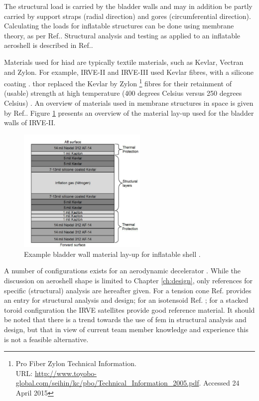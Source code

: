 The structural load is carried by the bladder walls and may in addition be partly carried by support straps (radial direction) and gores (circumferential direction). Calculating the loads for inflatable structures can be done using membrane theory, as per Ref.\cite{Young2002}. Structural analysis and testing as applied to an inflatable aeroshell is described in Ref.\cite{Lindell2006}.

Materials used for \gls{hiad} are typically textile materials, such as Kevlar, Vectran and Zylon. For example, IRVE-II and IRVE-III used Kevlar fibres, with a silicone coating \cite{Dillman2012a}. \gls{thor} replaced the Kevlar by Zylon \footnote{Pro Fiber Zylon Technical Information. \\ URL: \url{http://www.toyobo-global.com/seihin/kc/pbo/Technical\_Information\_2005.pdf}. Accessed 24 April 2015} fibres for their retainment of (usable) strength at high temperature (400 degrees Celsius versus 250 degrees Celsius) \cite{Dillman2014}. An overview of materials used in membrane structures in space is given by Ref.\cite{Jenkins2001}. Figure \ref{fig:matlayup} presents an overview of the material lay-up used for the bladder walls of IRVE-II.

\begin{figure}[H]
\centering
\includegraphics[width = 0.55\textwidth]{Figure/IRVE2_bladder_mat.PNG}
\caption{Example bladder wall material lay-up for inflatable shell \cite[p.2]{Dillman2010}.}
\label{fig:matlayup}
\end{figure}

A number of configurations exists for an aerodynamic decelerator \cite{Smith2010}. While the discussion on aeroshell shape is limited to Chapter \ref{ch:design}, only references for specific (structural) analysis are hereafter given. For a tension cone Ref. \cite{Yamada2009} provides an entry for structural analysis and design; for an isotensoid Ref. \cite{Smith2011}; for a stacked toroid configuration the IRVE satellites provide good reference material. It should be noted that there is a trend towards the use of \gls{fem} in structural analysis and design, but that in view of current team member knowledge and experience this is not a feasible alternative.

